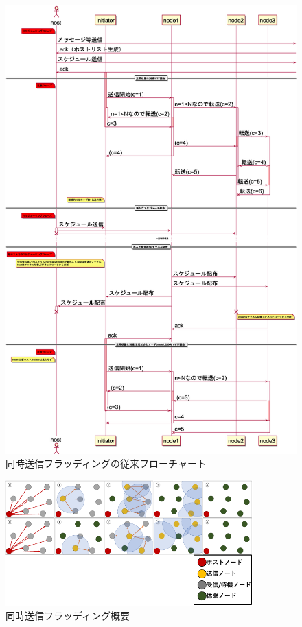 \vspace{-30mm}
\begin{figure}[H]
  \centering
  \includegraphics[width=1\textwidth]{figures/sequence_jurai.eps}
  \caption{同時送信フラッディングの従来フローチャート}
  \label{fig:ctf_ju}
\end{figure}

 \begin{figure}[H]
\centering
\includegraphics[width=0.85\textwidth]{figures/newctf.pdf}
 \vspace{-1mm}
 \caption{同時送信フラッディング概要}
 \label{fig:ctf_ov}
\end{figure}

